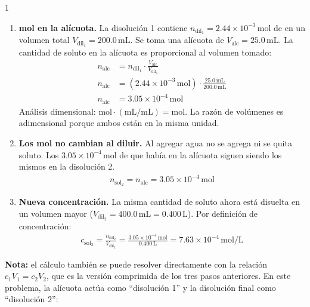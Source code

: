 \begin{exercise}{1}{}
\begin{enumerate}
    \item \textbf{mol en la alícuota.} La disolución 1 contiene 
    $n_{\mathrm{dil_1}} = 2.44\times10^{-3}\,\mathrm{mol}$ de  
    en un volumen total $V_{\mathrm{dil_1}} = 200.0\,\mathrm{mL}$. Se toma una 
    alícuota de $V_{\mathrm{alc}} = 25.0\,\mathrm{mL}$. La cantidad de soluto en 
    la alícuota es proporcional al volumen tomado:
    \begin{align*}
        n_{\mathrm{alc}} &= n_{\mathrm{dil_1}} \cdot \frac{V_{\mathrm{alc}}}{V_{\mathrm{dil_1}}} \\[4pt]
        n_{\mathrm{alc}} &= (2.44\times10^{-3}\,\mathrm{mol}) \cdot 
        \frac{25.0\,\mathrm{mL}}{200.0\,\mathrm{mL}} \\[4pt]
        n_{\mathrm{alc}} &= 3.05\times10^{-4}\,\mathrm{mol}
    \end{align*}
    Análisis dimensional: $\mathrm{mol} \cdot (\mathrm{mL}/\mathrm{mL}) = \mathrm{mol}$. 
    La razón de volúmenes es adimensional porque ambos están en la misma unidad.

    \item \textbf{Los mol no cambian al diluir.} Al agregar agua no se agrega ni 
    se quita soluto. Los $3.05\times10^{-4}\,\mathrm{mol}$ de  
    que había en la alícuota siguen siendo los mismos en la disolución 2.
    \begin{align*}
        n_{\mathrm{sol_2}} = n_{\mathrm{alc}} = 3.05\times10^{-4}\,\mathrm{mol}
    \end{align*}

    \item \textbf{Nueva concentración.} La misma cantidad de soluto ahora está 
    disuelta en un volumen mayor ($V_{\mathrm{dil_2}} = 400.0\,\mathrm{mL} = 0.400\,\mathrm{L}$). 
    Por definición de concentración:
    \begin{align*}
        c_{\mathrm{sol_2}} = \frac{n_{\mathrm{sol_2}}}{V_{\mathrm{dil_2}}}
        = \frac{3.05\times10^{-4}\,\mathrm{mol}}{0.400\,\mathrm{L}}
        = 7.63\times10^{-4}\,\mathrm{mol/L}
    \end{align*}
\end{enumerate}

\textbf{Nota:} el cálculo también se puede resolver directamente con la relación 
$c_1 V_1 = c_2 V_2$, que es la versión comprimida de los tres pasos anteriores. 
En este problema, la alícuota actúa como ``disolución 1'' y la disolución final 
como ``disolución 2'':


\end{exercise}
